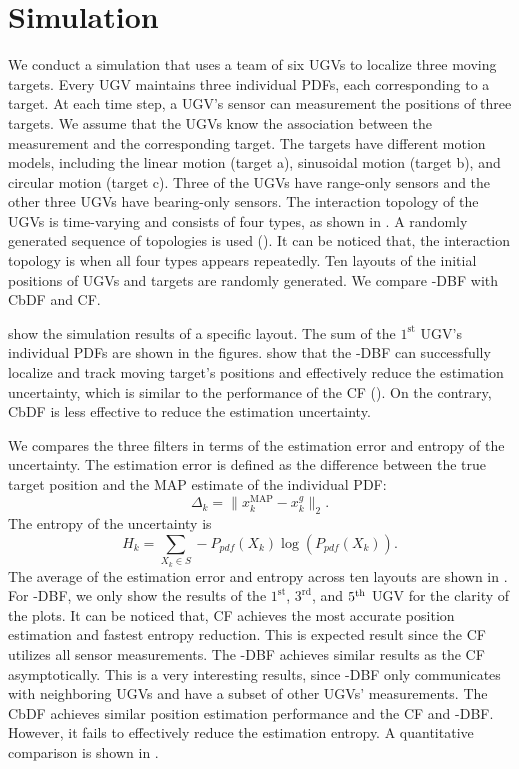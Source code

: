 \section{Simulation}\label{sec:sim}
	We conduct a simulation that uses a team of six UGVs to localize three moving targets.
	Every UGV maintains three individual PDFs, each corresponding to a target.
	At each time step, a UGV's sensor can measurement the positions of three targets.
	We assume that the UGVs know the association between the measurement and the corresponding target.
	The targets have different motion models, including the linear motion (target a), sinusoidal motion (target b), and circular motion (target c).
	Three of the UGVs have range-only sensors and the other three UGVs have bearing-only sensors.
	The interaction topology of the UGVs is time-varying and consists of four types, as shown in .
	A randomly generated sequence of topologies is used (\Cref{}).
	It can be noticed that, the interaction topology is \fc when all four types appears repeatedly.
	Ten layouts of the initial positions of UGVs and targets are randomly generated.
	We compare \proto-DBF with CbDF and CF.
	
	 show the simulation results of a specific layout.
	The sum of the $1^\text{st}$ UGV's individual PDFs are shown in the figures.
	 show that the \proto-DBF can successfully localize and track moving target's positions and effectively reduce the estimation uncertainty, which is similar to the performance of the CF ().
	On the contrary, CbDF is less effective to reduce the estimation uncertainty.
	
	We compares the three filters in terms of the estimation error and entropy of the uncertainty.
	The estimation error is defined as the difference between the true target position and the MAP estimate of the individual PDF:
	\begin{equation*}
		\Delta_k = \|x^\text{MAP}_k-x^g_k\|_2.
	\end{equation*}
	The entropy of the uncertainty is
	\begin{equation*}
		H_k = \sum\limits_{X_k\in S} -P_{pdf}(X_k)\log(P_{pdf}(X_k)).
	\end{equation*}
	The average of the estimation error and entropy across ten layouts are shown in .
	For \proto-DBF, we only show the results of the $1^\text{st}$, $3^\text{rd}$, and $5^\text{th}$ UGV for the clarity of the plots.
	It can be noticed that, CF achieves the most accurate position estimation and fastest entropy reduction. 
	This is expected result since the CF utilizes all sensor measurements.
	The \proto-DBF achieves similar results as the CF asymptotically. 
	This is a very interesting results, since \proto-DBF only communicates with neighboring UGVs and have a subset of other UGVs' measurements.
	The CbDF achieves similar position estimation performance and the CF and \proto-DBF. 
	However, it fails to effectively reduce the estimation entropy.
	A quantitative comparison is shown in .

